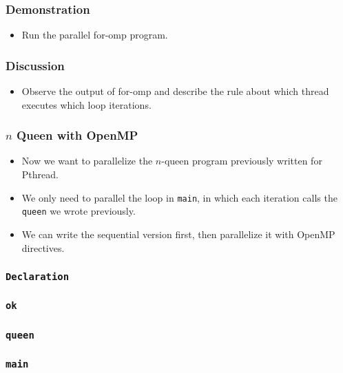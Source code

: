 \documentclass{beamer}
\begin{document}
\begin{frame}
\frametitle{Demonstration}
\begin{itemize}
\item Run the parallel for-omp program.
\end{itemize}
\end{frame}

\begin{frame}
\frametitle{Discussion}
\begin{itemize}
\item Observe the output of for-omp and describe the rule about which
  thread executes which loop iterations.
\end{itemize}
\end{frame}

\begin{frame}
\frametitle{$n$ Queen with OpenMP}
\begin{itemize}
\item Now we want to parallelize the $n$-queen program previously
  written for Pthread.
\item We only need to parallel the loop in {\tt main}, in which each
  iteration calls the {\tt queen} we wrote previously.
\item We can write the sequential version first, then parallelize it
  with OpenMP directives.
\end{itemize}
\end{frame}


\begin{frame}
\frametitle{\tt Declaration} 
\end{frame}

\begin{frame}
\frametitle{\tt ok} 
\end{frame}

\begin{frame}
\frametitle{\tt queen} 
\end{frame}

\begin{frame}
\frametitle{\tt main} 
\end{frame}
\end{document}
